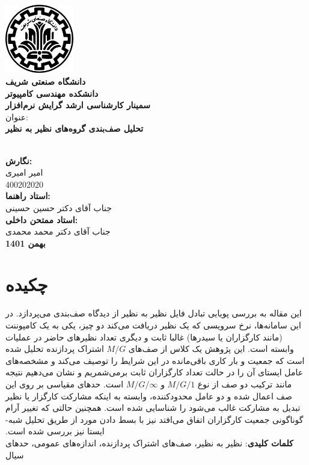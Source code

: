 \documentclass[11pt, oneside]{article}
\begin{document}
	\begin{titlepage}
		\linespread{1.5}
		\centering
		\includegraphics[width=3cm]{sharif-logo.png}\\[\bigskipamount]
		\normalsize	\textbf{دانشگاه صنعتی شریف}\\
		\textbf{دانشکده مهندسی کامپیوتر}\\
		\textbf{سمینار کارشناسی ارشد گرایش نرم‌افزار}%
		\\[1.3cm]

		{\LARGE		عنوان:\\
		\textbf{تحلیل صف‌بندی گروه‌های نظیر به نظیر}\\
		\textbf{}\\[2cm]}

		{\Large
		\textbf{نگارش:} \\
		امیر امیری\\
		400202020\\[1.3cm]
		\textbf{استاد راهنما:} \\
		جناب آقای دکتر حسین حسینی\\[1.3cm]

		\textbf{استاد ممتحن داخلی:}\\
		جناب آقای دکتر محمد محمدی\\[1.3cm]
		\vfill
		\textbf{بهمن 1401}
		}
	\end{titlepage}
	\clearpage
	\setcounter{figure}{0}


\section*{چکیده}
‫این مقاله به بررسی پویایی‌ تبادل فایل نظیر به نظیر از دیدگاه صف‌بندی می‌پردازد. در این سامانه‌ها، نرخ سرویسی که یک نظیر دریافت می‌کند  دو چیز، یکی به یک کامپوننت (مانند کارگزاران یا سیدر‌ها) غالبا ثابت و دیگری تعداد نظیرهای حاضر در عملیات وابسته است. این پژوهش یک کلاس از صف‌های $M/G$ اشتراک پردازنده تحلیل شده است که جمعیت و بار کاری باقی‌مانده در این شرایط را توصیف می‌کند و مشخصه‌های عامل ایستای ‌آن را در حالت تعداد کارگزاران ثابت برمی‌شمریم و نشان می‌دهیم نتیجه مانند ترکیب دو صف از نوع $M/G/1$ و $M/G/\infty$ است. حدهای مقیاسی بر روی این صف اعمال شده و دو عامل محدودکننده، وابسته به اینکه مشارکت کارگزار یا نظیر تبدیل به مشارکت غالب می‌شود را شناسایی شده است. همچنین حالتی که تغییر آرام گوناگونی جمعیت کارگزاران اتفاق می‌افتد نیز با بسط دادن مورد از طریق تحلیل‌ شبه-ایستا نیز بررسی شده است.
\\[1ex]
\textbf{کلمات کلیدی}: نظیر به نظیر، صف‌های اشتراک پردازنده، اندا‌زه‌های عمومی، حد‌های سیال
\end{document}
